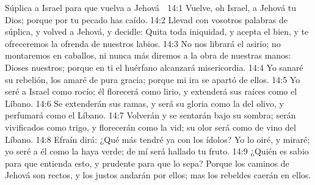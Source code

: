 Súplica a Israel para que vuelva a Jehová  

14:1 Vuelve, oh Israel, a Jehová tu Dios; porque por tu pecado has caído.  
14:2 Llevad con vosotros palabras de súplica, y volved a Jehová, y decidle: Quita toda iniquidad, y acepta el bien, y te ofreceremos la ofrenda de nuestros labios.  
14:3 No nos librará el asirio; no montaremos en caballos, ni nunca más diremos a la obra de nuestras manos: Dioses nuestros; porque en ti el huérfano alcanzará misericordia.  
14:4 Yo sanaré su rebelión, los amaré de pura gracia; porque mi ira se apartó de ellos.  
14:5 Yo seré a Israel como rocío; él florecerá como lirio, y extenderá sus raíces como el Líbano.  
14:6 Se extenderán sus ramas, y será su gloria como la del olivo, y perfumará como el Líbano.  
14:7 Volverán y se sentarán bajo su sombra; serán vivificados como trigo, y florecerán como la vid; su olor será como de vino del Líbano.  
14:8 Efraín dirá: ¿Qué más tendré ya con los ídolos? Yo lo oiré, y miraré; yo seré a él como la haya verde; de mí será hallado tu fruto.  
14:9 ¿Quién es sabio para que entienda esto, y prudente para que lo sepa? Porque los caminos de Jehová son rectos, y los justos andarán por ellos; mas los rebeldes caerán en ellos.

